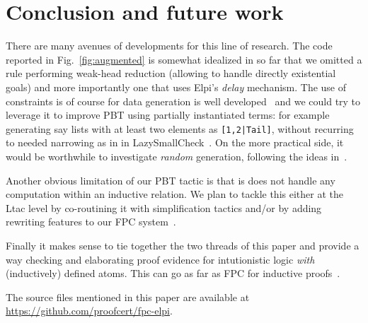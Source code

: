 \section{Conclusion and future work}


There are many avenues of developments for this line of research.
The code reported in Fig.~\ref{fig:augmented} is somewhat idealized in
so far that we omitted a rule performing weak-head reduction (allowing
to handle directly existential goals) and more importantly one that uses
 Elpi's \emph{delay} mechanism. %
The
use of constraints is of course for data generation is well
developed~\cite{FioravantiPS15} and we could try to leverage it to
improve PBT using partially instantiated terms: for example generating
say lists with at least two elements as \texttt{[1,2|Tail]}, without
recurring to needed narrowing as in in
LazySmallCheck~\cite{smallcheck}. On the more practical side, it would be worthwhile to investigate \emph{random} generation, following the ideas in~\cite{pltredexconstraintlogic,blanco19ppdp}.

Another obvious limitation of our PBT tactic is that is does not 
 handle any computation within an inductive relation. We plan to tackle this either at the Ltac level by co-routining it with simplification tactics and/or by adding rewriting features to our FPC system~\cite{ChihaniM16}.

 Finally it makes sense to tie together the two threads of this paper
 and provide a way checking and elaborating proof evidence for
 intutionistic logic \emph{with} (inductively) defined atoms. This
 can go as far as FPC for inductive proofs~\cite{blanco15wof}.

 \smallskip
 The source files mentioned in this paper are available at \url{https://github.com/proofcert/fpc-elpi}.


